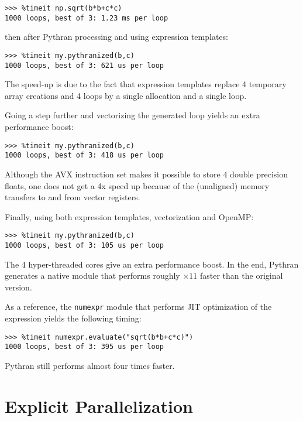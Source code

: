 \documentclass[10pt, onecolumn, preprint]{sigplanconf}
\begin{document}
\begin{lstlisting}
>>> %timeit np.sqrt(b*b+c*c)
1000 loops, best of 3: 1.23 ms per loop
\end{lstlisting}

\noindent then after Pythran processing and using expression templates:

\begin{lstlisting}
>>> %timeit my.pythranized(b,c)
1000 loops, best of 3: 621 us per loop
\end{lstlisting}

The speed-up is due to the fact that expression templates replace 4 temporary
array creations and 4 loops by a single allocation and a single loop.

Going a step further and vectorizing the generated loop yields an extra
performance boost:

\begin{lstlisting}
>>> %timeit my.pythranized(b,c)
1000 loops, best of 3: 418 us per loop
\end{lstlisting}

Although the AVX instruction set makes it possible to store 4 double precision
floats, one does not get a 4x speed up because of the (unaligned) memory transfers
to and from vector registers.

Finally, using both expression templates, vectorization and OpenMP:

\begin{lstlisting}
>>> %timeit my.pythranized(b,c)
1000 loops, best of 3: 105 us per loop
\end{lstlisting}

The 4 hyper-threaded cores give an extra performance boost. In the end, Pythran
generates a native module that performs roughly $\times11$ faster than the
original version.

As a reference, the \texttt{numexpr} module that performs JIT optimization of the
expression yields the following timing:

\begin{lstlisting}
>>> %timeit numexpr.evaluate("sqrt(b*b+c*c)")
1000 loops, best of 3: 395 us per loop
\end{lstlisting}

\noindent Pythran still performs almost four times faster.

\section{Explicit Parallelization}
\label{sec:openmp}
\end{document}
